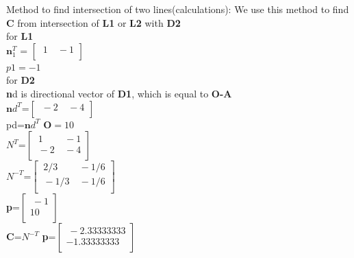 \documentclass{beamer}
\begin{document}
\begin{frame}{Method to find intersection of two lines(calculations):}
We use this method to find \textbf{C} from intersection of \textbf{L1} or \textbf{L2} with \textbf{D2}\\
for \textbf{L1}\\ 
$\textbf{n}_1^T$ = $
\begin{bmatrix}
  \ 1 &\ -1 \\
\end{bmatrix} $ \\
$ p1=-1 $\\
for \textbf{D2}\\ 
\textbf{n}d is directional vector of \textbf{D1}, which is equal to \textbf{O-A}\\
$\textbf{n}d^T$=$\begin{bmatrix}
  \ -2 &\ -4 \\

\end{bmatrix}$ \\
  pd=$\textbf{n}d^T$ $\textbf{O}=10$\\
  
  $N^T$=$\begin{bmatrix}
  \ 1 &\ -1 \\
  \ -2 &\ -4 \\
\end{bmatrix}$ \\
$N^{-T}$=$\begin{bmatrix}
  \ 2/3 &\ -1/6 \\
  \ -1/3 &\ -1/6 \\
\end{bmatrix}$ \\
\textbf{p}=$\begin{bmatrix}
  \ -1 \\ 10 \\
\end{bmatrix}$ \\

\textbf{C}=$ N^{-T} $ \textbf{p}=$\begin{bmatrix}
  \ -2.33333333 \\ -1.33333333 \\
\end{bmatrix}$

 
\end{frame}
\end{document}
